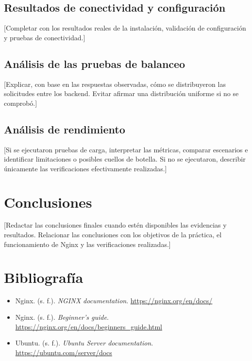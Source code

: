 \documentclass[12pt,letterpaper]{article}
\begin{document}
\subsection{Resultados de conectividad y configuración}
[Completar con los resultados reales de la instalación, validación de configuración y pruebas de conectividad.]

\subsection{Análisis de las pruebas de balanceo}
[Explicar, con base en las respuestas observadas, cómo se distribuyeron las solicitudes entre los backend. Evitar afirmar una distribución uniforme si no se comprobó.]

\subsection{Análisis de rendimiento}
[Si se ejecutaron pruebas de carga, interpretar las métricas, comparar escenarios e identificar limitaciones o posibles cuellos de botella. Si no se ejecutaron, describir únicamente las verificaciones efectivamente realizadas.]


\section{Conclusiones}
[Redactar las conclusiones finales cuando estén disponibles las evidencias y resultados. Relacionar las conclusiones con los objetivos de la práctica, el funcionamiento de Nginx y las verificaciones realizadas.]


\section{Bibliografía}
\begin{itemize}
    \item Nginx. (s. f.). \textit{NGINX documentation}. \url{https://nginx.org/en/docs/}
    \item Nginx. (s. f.). \textit{Beginner's guide}. \url{https://nginx.org/en/docs/beginners_guide.html}
    \item Ubuntu. (s. f.). \textit{Ubuntu Server documentation}. \url{https://ubuntu.com/server/docs}
\end{itemize}
\end{document}
